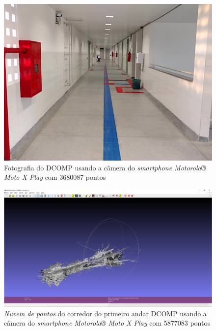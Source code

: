 \begin{figure}[H]
	\centering
		\includegraphics[width= \textwidth]{Imagens/scene00087.jpg}
	\caption{Fotografia do DCOMP usando a câmera do \textit{smartphone Motorola® Moto X Play} com 3680087 pontos}
\end{figure}

\begin{figure}[H]
	\centering
		\includegraphics[width= \textwidth]{Imagens/corredorMotox.PNG}
	\caption{\textit{Nuvem de pontos} do corredor do primeiro andar DCOMP usando a câmera do \textit{smartphone Motorola® Moto X Play} com 5877083 pontos}
\end{figure}

